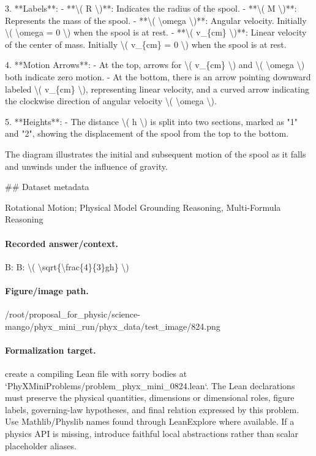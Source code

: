3. **Labels**:
   - **\textbackslash{}( R \textbackslash{})**: Indicates the radius of the spool.
   - **\textbackslash{}( M \textbackslash{})**: Represents the mass of the spool.
   - **\textbackslash{}( \textbackslash{}omega \textbackslash{})**: Angular velocity. Initially \textbackslash{}( \textbackslash{}omega = 0 \textbackslash{}) when the spool is at rest.
   - **\textbackslash{}( v\_\{cm\} \textbackslash{})**: Linear velocity of the center of mass. Initially \textbackslash{}( v\_\{cm\} = 0 \textbackslash{}) when the spool is at rest.

4. **Motion Arrows**:
   - At the top, arrows for \textbackslash{}( v\_\{cm\} \textbackslash{}) and \textbackslash{}( \textbackslash{}omega \textbackslash{}) both indicate zero motion.
   - At the bottom, there is an arrow pointing downward labeled \textbackslash{}( v\_\{cm\} \textbackslash{}), representing linear velocity, and a curved arrow indicating the clockwise direction of angular velocity \textbackslash{}( \textbackslash{}omega \textbackslash{}).

5. **Heights**:
   - The distance \textbackslash{}( h \textbackslash{}) is split into two sections, marked as "1" and "2", showing the displacement of the spool from the top to the bottom.

The diagram illustrates the initial and subsequent motion of the spool as it falls and unwinds under the influence of gravity.

\#\# Dataset metadata

Rotational Motion; Physical Model Grounding Reasoning, Multi-Formula Reasoning

\paragraph{Recorded answer/context.}
B: B: \textbackslash{}( \textbackslash{}sqrt\{\textbackslash{}frac\{4\}\{3\}gh\} \textbackslash{})

\paragraph{Figure/image path.}
/root/proposal\_for\_physic/science-mango/phyx\_mini\_run/phyx\_data/test\_image/824.png

\paragraph{Formalization target.}
create a compiling Lean file with sorry bodies at `PhyXMiniProblems/problem\_phyx\_mini\_0824.lean`. The Lean declarations must preserve the physical quantities, dimensions or dimensional roles, figure labels, governing-law hypotheses, and final relation expressed by this problem.
Use Mathlib/Physlib names found through LeanExplore where available. If a physics API is missing, introduce faithful local abstractions rather than scalar placeholder aliases.

